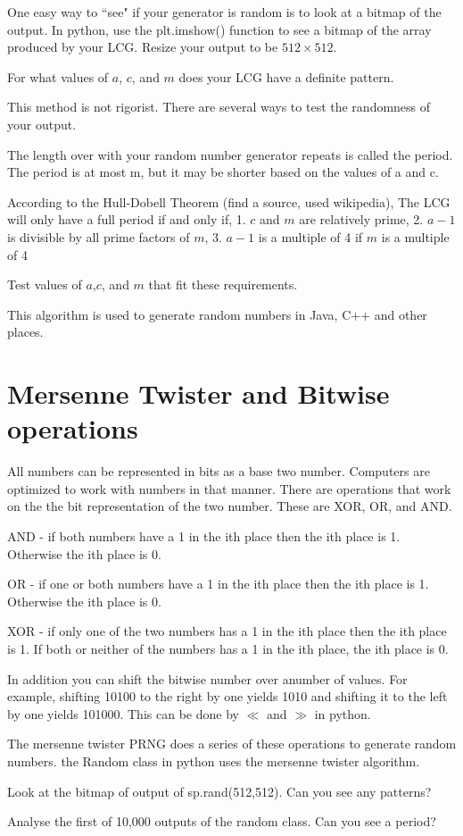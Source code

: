 One easy way to ``see" if your generator is random is to look at a bitmap of the output. In python, use the plt.imshow() function to see a bitmap of the array produced by your LCG. Resize your output to be $512 \times 512$. 

\begin{problem}
For what values of $a$, $c$, and $m$ does your LCG have a definite pattern.
\end{problem}

This method is not rigorist. There are several ways to test the randomness of your output. 

The length over with your random number generator repeats is called the period. The period is at most m, but it may be shorter based on the values of a and c.
 
According to the Hull-Dobell Theorem (find a source, used wikipedia), The LCG will only have a full period if and only if, 
1. $c$ and $m$ are relatively prime,
2. $a-1$ is divisible by all prime factors of $m$,
3. $a-1$ is a multiple of 4 if $m$ is a multiple of 4

\begin{problem}
Test values of $a$,$c$, and $m$ that fit these requirements. 
\end{problem}

This algorithm is used to generate random numbers in Java, C++ and other places.

\section*{Mersenne Twister and Bitwise operations}


All numbers can be represented in bits as a base two number. Computers are optimized to work with numbers in that manner. There are operations that work on the the bit representation of the two number. These are XOR, OR, and AND. 

AND - if both numbers have a 1 in the ith place then the ith place is 1. Otherwise the ith place is 0.

OR - if one or both numbers have a 1 in the ith place then the ith place is 1. Otherwise the ith place is 0.

XOR - if only one of the two numbers has a 1 in the ith place then the ith place is 1. If both or neither of the numbers has a 1 in the ith place, the ith place is 0.

In addition you can shift the bitwise number over anumber of values. For example, shifting 10100 to the right by one yields 1010 and shifting it to the left by one yields 101000. This can be done by $\ll$ and $\gg$ in python. 


The mersenne twister PRNG does a series of these operations to generate random numbers. the Random class in python uses the mersenne twister algorithm. 

\begin{problem}
Look at the bitmap of output of sp.rand(512,512). Can you see any patterns?
\end{problem}

\begin{problem}
Analyse the first of 10,000 outputs of the random class. Can you see a period?
\end{problem}
